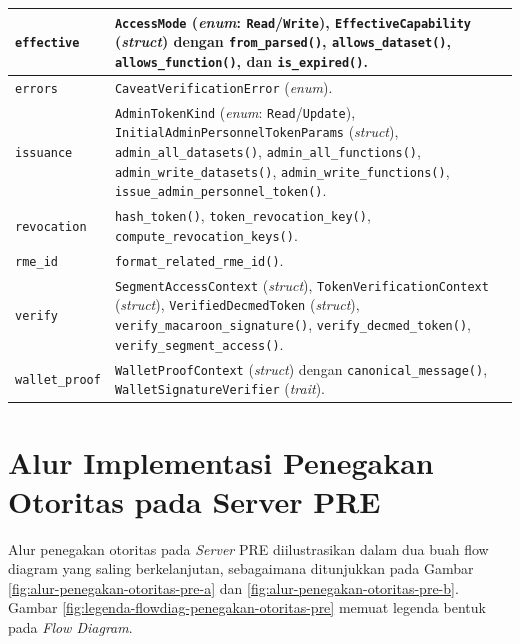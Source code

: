 \documentclass[bahasa, 12pt, a4paper, onecolumn, oneside, final]{report}
\begin{document}
\begin{longtable}{|>{\raggedright\arraybackslash}p{}|>{\raggedright\arraybackslash}p{}|}
	\texttt{effective}
	               & \texttt{AccessMode} (\textit{enum}: \texttt{Read}/\texttt{Write}), \texttt{EffectiveCapability} (\textit{struct}) dengan \texttt{from\_parsed()}, \texttt{allows\_dataset()}, \texttt{allows\_function()}, dan \texttt{is\_expired()}.
	\\ \hline

	\texttt{errors}
	               & \texttt{CaveatVerificationError} (\textit{enum}).
	\\ \hline

	\texttt{issuance}
	               & \texttt{AdminTokenKind} (\textit{enum}: \texttt{Read}/\texttt{Update}), \texttt{InitialAdminPersonnelTokenParams} (\textit{struct}), \texttt{admin\_all\_datasets()}, \texttt{admin\_all\_functions()}, \texttt{admin\_write\_datasets()}, \texttt{admin\_write\_functions()}, \texttt{issue\_admin\_personnel\_token()}.
	\\ \hline

	\texttt{revocation}
	               & \texttt{hash\_token()}, \texttt{token\_revocation\_key()}, \texttt{compute\_revocation\_keys()}.
	\\ \hline

	\texttt{rme\_id}
	               & \texttt{format\_related\_rme\_id()}.
	\\ \hline

	\texttt{verify}
	               & \texttt{SegmentAccessContext} (\textit{struct}), \texttt{TokenVerificationContext} (\textit{struct}), \texttt{VerifiedDecmedToken} (\textit{struct}), \texttt{verify\_macaroon\_signature()}, \texttt{verify\_decmed\_token()}, \texttt{verify\_segment\_access()}.
	\\ \hline

	\texttt{wallet\_proof}
	               & \texttt{WalletProofContext} (\textit{struct}) dengan \texttt{canonical\_message()}, \texttt{WalletSignatureVerifier} (\textit{trait}).
	\\ \hline
\end{longtable}
\endgroup
\chapter{Alur Implementasi Penegakan Otoritas pada Server PRE}
\label{lampiran:alur-implementasi-penegakan-otoritas-pre}

Alur penegakan otoritas pada \textit{Server} PRE diilustrasikan dalam dua buah flow diagram yang saling berkelanjutan, sebagaimana ditunjukkan pada Gambar \ref{fig:alur-penegakan-otoritas-pre-a} dan \ref{fig:alur-penegakan-otoritas-pre-b}. Gambar \ref{fig:legenda-flowdiag-penegakan-otoritas-pre} memuat legenda bentuk pada \textit{Flow Diagram}.
\end{document}
